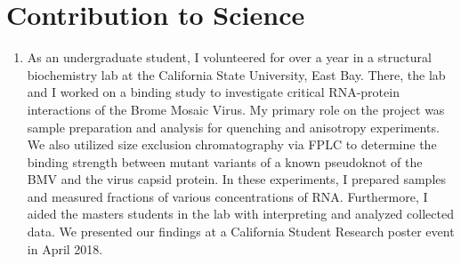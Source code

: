 \documentclass{nihbiosketch}
\begin{document}
\section{Contribution to Science}

\begin{enumerate}

\item As an undergraduate student, I volunteered for over a year in a structural biochemistry lab at the California State University, East Bay. There, the lab and I worked on a binding study to investigate critical RNA-protein interactions of the Brome Mosaic Virus. My primary role on the project was sample preparation and analysis for quenching and anisotropy experiments. We also utilized size exclusion chromatography via FPLC to determine the binding strength between mutant variants of a known pseudoknot of the BMV and the virus capsid protein. In these experiments, I prepared samples and measured fractions of various concentrations of RNA. Furthermore, I aided the masters students in the lab with interpreting and analyzed collected data. We presented our findings at a California Student Research poster event in April 2018.






\end{enumerate}
\end{document}
